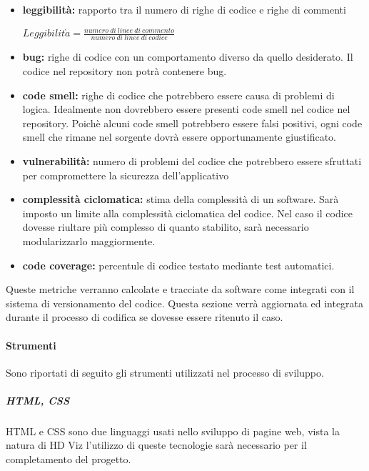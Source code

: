 \begin{itemize}
    \item \textbf{leggibilità:} rapporto tra il numero di righe di codice e righe di commenti
    \begin{center}
        $Leggibilit\grave{a} = \frac{numero\ di\ linee\ di\ commento}{numero\ di\ linee\ di\ codice}$
    \end{center}
    \item \textbf{bug:} righe di codice con un comportamento diverso da quello desiderato. Il codice
    nel repository non potrà contenere bug.
    \item \textbf{code smell:} righe di codice che potrebbero essere causa di problemi di logica.
    Idealmente non dovrebbero essere presenti code smell nel codice nel repository. Poichè alcuni code smell potrebbero
    essere falsi positivi, ogni code smell che rimane nel sorgente dovrà essere opportunamente giustificato.
    \item \textbf{vulnerabilità:} numero di problemi del codice che potrebbero essere sfruttati per compromettere la
    sicurezza dell'applicativo
    \item \textbf{complessità ciclomatica:} stima della complessità di un software. Sarà imposto un limite alla
    complessità ciclomatica del codice. Nel caso il codice dovesse riultare più complesso di quanto stabilito, sarà
    necessario modularizzarlo maggiormente.
    \item \textbf{code coverage:} percentule di codice testato mediante test automatici.
\end{itemize}

Queste metriche verranno calcolate e tracciate da software come  integrati con il sistema di
versionamento del codice.
Questa sezione verrà aggiornata ed integrata durante il processo di codifica se dovesse essere ritenuto il caso.

\paragraph{Strumenti}

Sono riportati di seguito gli strumenti utilizzati nel processo di sviluppo.

\subparagraph{HTML, CSS}

HTML e CSS sono due linguaggi usati nello sviluppo di pagine web, vista la natura di HD Viz l'utilizzo di queste
tecnologie sarà necessario per il completamento del progetto.

